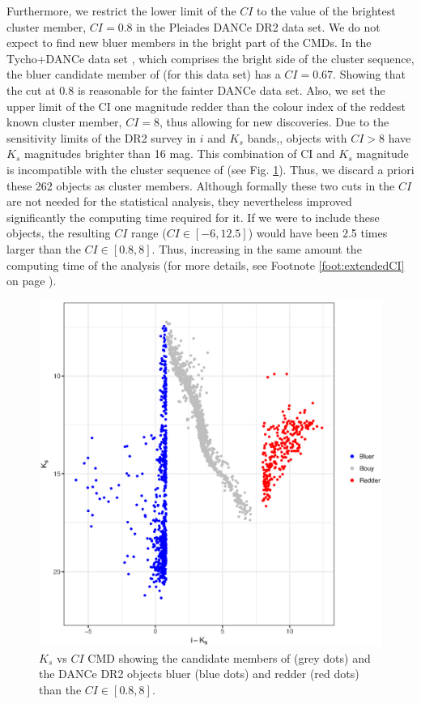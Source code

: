 Furthermore, we restrict the lower limit of the $CI$ to the value of the brightest cluster member, $CI =0.8$ in the Pleiades DANCe DR2 data set. We do not expect to find new bluer members in the bright part of the CMDs. In the Tycho+DANCe data set \citep{Bouy2015}, which comprises the bright side of the cluster sequence, the bluer candidate member of \citet{Bouy2015} (for this data set) has a $CI=0.67$. Showing that the cut at 0.8 is reasonable for the fainter DANCe data set. Also, we set the upper limit of the CI one magnitude redder than the colour index of the reddest known cluster member, $CI=8$, thus allowing for new discoveries. Due to the sensitivity limits of the DR2 survey in $i$ and $K_s$ bands,\cite[$i\sim23$ mag and $K_s\sim18$ mag, see Appendix A of][]{Bouy2015}, objects with $CI>8$ have $K_s$ magnitudes brighter than 16 mag. This combination of CI and $K_s$ magnitude is incompatible with the cluster sequence of \citet{Bouy2015} (see Fig. \ref{fig:incompatible_objects}). Thus, we discard a priori these 262 objects as cluster members. Although formally these two cuts in the $CI$ are not needed for the statistical analysis, they nevertheless improved significantly the computing time required for it. If we were to include these objects, the resulting $CI$ range ($CI\in[-6,12.5]$) would have been 2.5 times larger than the $CI\in[0.8,8]$. Thus, increasing in the same amount the computing time of the analysis (for more details, see Footnote \ref{foot:extendedCI} on page \pageref{foot:extendedCI}).

\begin{figure}[ht!]
\begin{center}
\includegraphics[width=\textwidth]{background/Figures/ColourCuts.eps}
\caption{$K_s$ vs $CI$ CMD showing the candidate members of \citet{Bouy2015}(grey dots) and the DANCe DR2 objects bluer (blue dots) and redder (red dots) than the $CI\in[0.8,8]$.}
\label{fig:incompatible_objects}
\end{center}
\end{figure}


